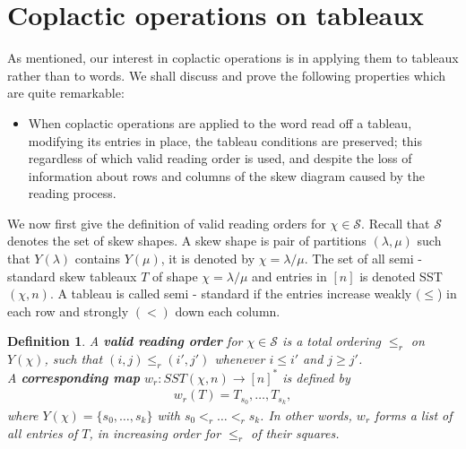 \documentclass{article}
\newtheorem{defn}{Definition}
\begin{document}
\section{Coplactic operations on tableaux}
As mentioned, our interest in coplactic operations is in applying them to tableaux rather than to words. We shall discuss and prove the following properties which are quite remarkable:
\begin{itemize}
    \item When coplactic operations are applied to the word read off a tableau, modifying its entries in place, the tableau conditions are preserved; this regardless of which valid reading order is used, and despite the loss of information about rows and columns of the skew diagram caused by the reading process.
\end{itemize}
We now first give the definition of valid reading orders for $\chi \in \mathcal{S}$. Recall that $\mathcal{S}$ denotes the set of skew shapes. A skew shape is pair of partitions $(\lambda, \mu)$ such that $Y( \lambda)$ contains $Y(\mu)$, it is denoted by $\chi = \lambda/ \mu$. The set of all semi - standard skew tableaux $T$ of shape $\chi = \lambda / \mu$ and entries in $[n]$ is denoted SST$(\chi, n).$ A tableau is called semi - standard if the
entries increase weakly $(\leq$) in each row and strongly $(<)$ down each column.
\begin{defn}
A \textbf{valid reading order} for $\chi \in \mathcal{S}$ is a total ordering $\leq_r$ on $Y( \chi)$, such that $(i,j) \leq_r (i',j')$ whenever $i \leq i'$ and $j \geq j'$. \\
A \textbf{corresponding map} $w_r: SST( \chi , n) \to [n]^*$ is defined by 
\begin{align*}
    w_r(T) = T_{s_0}, \dots ,   T_{s_k},
\end{align*}
where $Y( \chi)= \{ s_0, \dots , s_k\}$ with $s_0 <_r \dots <_r s_k$. In other words, $w_r$ forms a list of all entries of $T$, in increasing order for $\leq_r$ of their squares. 
\end{defn}
\end{document}
